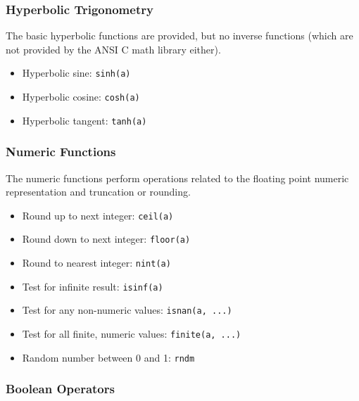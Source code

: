 \subsubsection{Hyperbolic Trigonometry}

The basic hyperbolic functions are provided, but no inverse functions (which are not provided by the ANSI C math library 
either).

\begin{itemize}
\item Hyperbolic sine: \verb|sinh(a)|

\item Hyperbolic cosine: \verb|cosh(a)|

\item Hyperbolic tangent: \verb|tanh(a)|

\end{itemize}

\subsubsection{Numeric Functions}

The numeric functions perform operations related to the floating point numeric representation and truncation or rounding.

\begin{itemize}
\item Round up to next integer: \verb|ceil(a)|

\item Round down to next integer: \verb|floor(a)|

\item Round to nearest integer: \verb|nint(a)|

\item Test for infinite result: \verb|isinf(a)|

\item Test for any non-numeric values: \verb|isnan(a, ...)|

\item Test for all finite, numeric values: \verb|finite(a, ...)|

\item Random number between 0 and 1: \verb|rndm|

\end{itemize}

\subsubsection{Boolean Operators}

